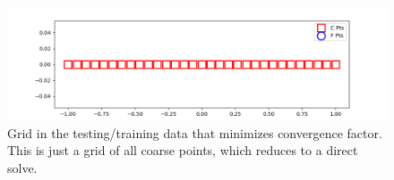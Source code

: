 \begin{figure}[h]
  \centering
  \includegraphics[scale=0.7]{figures/jacobi-conv/conv_opt_grid_in_data.png}
  \caption{Grid in the testing/training data that minimizes convergence factor.  This is just a grid of all coarse points, which reduces to a direct solve.}
  \label{fig:optimized_grid_in_data}
\end{figure}



